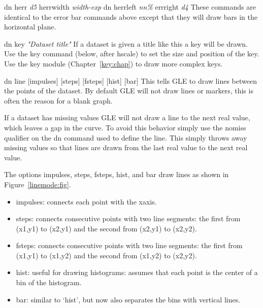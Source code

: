 \begin{commanddescription}
\item[{\sf dn herr {\it d5} herrwidth {\it width-exp} 	dn herrleft {\it nn\%} errright {\it d4}} ]
   
These commands are identical to the error bar commands above except that
they will draw bars in the horizontal plane.

\item[{\sf dn key {\it "Dataset title"}}  ]
If a dataset is given a title like this a key will be drawn.  Use the
{\sf key} command (below, after hscale) to set the size and
position of the key.  Use the key module (Chapter~\ref{key:chap}) to draw
more complex keys.

\item[{\sf dn line [impulses] [steps] [fsteps] [hist] [bar]}]
This tells GLE to draw lines between the points of the dataset.  By
default GLE will not draw lines or markers, this is often the reason
for a blank graph.

If a dataset has missing values GLE will not draw a line to the next
real value, which leaves a gap in the curve.  To avoid this
behavior simply use the {\sf nomiss} qualifier on the {\sf dn} command
used to define the line. This simply throws away missing values so that
lines are drawn from the last real value to the next real value.

The options {\sf impulses}, {\sf steps}, {\sf fsteps}, {\sf hist}, and {\sf bar} draw lines as shown in Figure~\ref{linemode:fig}.
\begin{itemize}
\item {\sf impulses}: connects each point with the xaxis.

\item {\sf steps}: connects consecutive points with two line segments: the first from (x1,y1) to (x2,y1) and the second from (x2,y1) to (x2,y2).

\item {\sf fsteps}: connects consecutive points with two line segments: the first from (x1,y1) to (x1,y2) and the second from (x1,y2) to (x2,y2).

\item {\sf hist}: useful for drawing histograms: assumes that each point is the center of a bin of the histogram.

\item {\sf bar}: similar to `{\sf hist}', but now also separates the bins with vertical lines.
\end{itemize}


\end{commanddescription}
